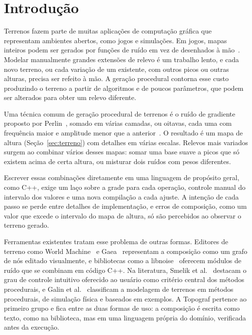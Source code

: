 \documentclass[sigconf, nonacm, screen, language=portuguese, language={main=english}]{acmart}
\begin{document}
\maketitle


\section{Introdução}\label{sec:introducao}
Terrenos fazem parte de muitas aplicações de computação gráfica que
representam ambientes abertos, como jogos e simulações. Em jogos, mapas
inteiros podem ser gerados por funções de ruído em vez de desenhados à
mão~\cite{patel_terrain_noise}. Modelar manualmente grandes extensões de
relevo é um trabalho lento, e cada novo terreno, ou cada variação de um
existente, com outros picos ou outras alturas, precisa ser refeito à
mão. A geração procedural contorna esse custo produzindo o terreno a
partir de algoritmos e de poucos parâmetros, que podem ser alterados
para obter um relevo diferente.

Uma técnica comum de geração procedural de terrenos é o ruído de
gradiente proposto por
Perlin~\cite{perlin1985image}, somado em várias camadas, ou oitavas,
cada uma com frequência maior e amplitude menor que a
anterior~\cite{patel_terrain_noise}. O resultado é um mapa de altura
(Seção~\ref{sec:terreno}) com detalhes em várias escalas. Relevos mais variados surgem
ao combinar vários desses mapas: somar uma base suave a picos que só
existem acima de certa altura, ou misturar dois ruídos com pesos
diferentes.

Escrever essas combinações diretamente em uma linguagem de propósito
geral, como C++, exige um laço sobre a grade para cada operação,
controle manual do intervalo dos valores e uma nova compilação a cada
ajuste. A intenção de cada passo se perde entre detalhes de
implementação, e erros de composição, como um valor que excede o
intervalo do mapa de altura, só são percebidos ao observar o terreno
gerado.

Ferramentas existentes tratam esse problema de outras formas. Editores
de terreno como World Machine~\cite{worldmachine} e Gaea~\cite{gaea}
representam a composição como um grafo de nós editado visualmente, e
bibliotecas como a libnoise~\cite{libnoise} oferecem módulos de ruído
que se combinam em código C++. Na literatura, Smelik et
al.~\cite{smelik2014survey} destacam o grau de controle intuitivo
oferecido ao usuário como critério central dos métodos procedurais, e
Galin et al.~\cite{galin2019review} classificam a modelagem de terrenos
em métodos procedurais, de simulação física e baseados em exemplos. A
Topograf pertence ao primeiro grupo e fica entre as duas formas de uso:
a composição é escrita como texto, como na biblioteca, mas em uma
linguagem própria do domínio, verificada antes da execução.
\end{document}
